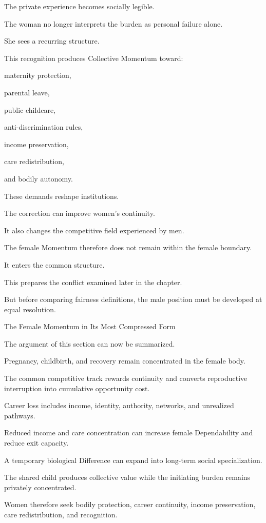 The private experience becomes socially legible.

The woman no longer interprets the burden as personal failure alone.

She sees a recurring structure.

This recognition produces Collective Momentum toward:

maternity protection,

parental leave,

public childcare,

anti-discrimination rules,

income preservation,

care redistribution,

and bodily autonomy.

These demands reshape institutions.

The correction can improve women’s continuity.

It also changes the competitive field experienced by men.

The female Momentum therefore does not remain within the female boundary.

It enters the common structure.

This prepares the conflict examined later in the chapter.

But before comparing fairness definitions, the male position must be developed at equal resolution.

The Female Momentum in Its Most Compressed Form

The argument of this section can now be summarized.

Pregnancy, childbirth, and recovery remain concentrated in the female body.

The common competitive track rewards continuity and converts reproductive interruption into cumulative opportunity cost.

Career loss includes income, identity, authority, networks, and unrealized pathways.

Reduced income and care concentration can increase female Dependability and reduce exit capacity.

A temporary biological Difference can expand into long-term social specialization.

The shared child produces collective value while the initiating burden remains privately concentrated.

Women therefore seek bodily protection, career continuity, income preservation, care redistribution, and recognition.

